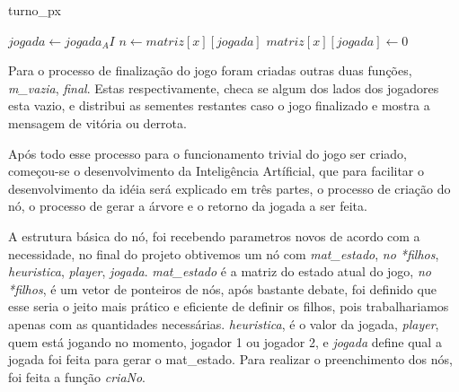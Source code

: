 \documentclass[a4paper, 12pt]{article}
\begin{document}
		\begin{algorithm}
		\caption{turno_px}\label{euclid}
		\begin{algorithmic}[1]
			\Else
				\State $jogada \gets jogada_AI$
			\Endif
			\State $n \gets matriz[x][jogada]$
			\State $matriz[x][jogada] \gets 0$
			\EndWhile
			\EndIf
			\EndIf
		\EndProcedure
		\end{algorithmic}
		\end{algorithm}
		
		\textrm{Para o processo de finalização do jogo foram criadas outras duas funções, \emph{m_vazia}, \emph{final}. Estas respectivamente, checa se algum dos lados dos jogadores esta vazio, e distribui as sementes restantes caso o jogo finalizado e mostra a mensagem de vitória ou derrota.}

		\textrm{Após todo esse processo para o funcionamento trivial do jogo ser criado, começou-se o desenvolvimento da Inteligência Artíficial, que para facilitar o desenvolvimento da idéia será explicado em três partes, o processo de criação do nó, o processo de gerar a árvore e o retorno da jogada a ser feita.}
		
		\textrm{A estrutura básica do nó, foi recebendo parametros novos de acordo com a necessidade, no final do projeto obtivemos um nó com \emph{mat_estado}, \emph{no *filhos}, \emph{heuristica}, \emph{player}, \emph{jogada}. \emph{mat_estado} é a matriz do estado atual do jogo, \emph{no *filhos}, é um vetor de ponteiros de nós, após bastante debate, foi definido que esse seria o jeito mais prático e eficiente de definir os filhos, pois trabalhariamos apenas com as quantidades necessárias. \emph{heuristica}, é o valor da jogada, \emph{player}, quem está jogando no momento, jogador 1 ou jogador 2, e \emph{jogada} define qual a jogada foi feita para gerar o mat_estado. Para realizar o preenchimento dos nós, foi feita a função \emph{criaNo}.}
	
\end{document}
